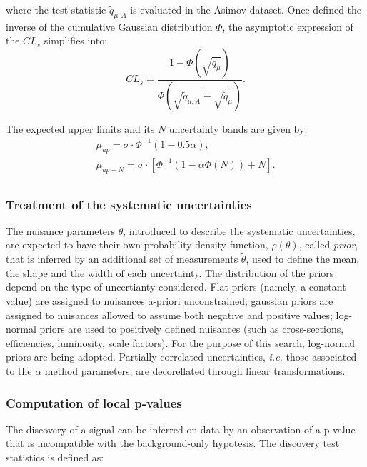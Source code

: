 \noindent where the test statistic $\tilde{q}_{\mu, A}$ is evaluated in the Asimov dataset. Once defined the inverse of the cumulative Gaussian distribution $\Phi$, the asymptotic expression of the $CL_s$ simplifies into:
\begin{equation}
CL_s = \frac{1 - \Phi \left( \sqrt{\tilde{q}_{\mu}} \right)}{ \Phi \left( \sqrt{\tilde{q}_{\mu, A}} - \sqrt{\tilde{q}_{\mu}} \right) }.
\end{equation}

\noindent The expected upper limits and its $N$ uncertainty bands are given by:
\begin{equation}
\begin{gathered}
\mu_{up} = \sigma \cdot \Phi^{-1} \left( 1 - 0.5 \alpha \right),\\
\mu_{up + N} = \sigma \cdot \left[ \Phi^{-1}  \left( 1 - \alpha \Phi(N)  \right) + N \right].\\
\end{gathered}
\end{equation}

\subsubsection{Treatment of the systematic uncertainties}
The nuisance parameters $\theta$, introduced to describe the systematic uncertainties, are expected to have their own probability density function, $\rho (\theta)$, called \emph{prior}, that is inferred by an additional set of measurements $\tilde{\theta}$, used to define the mean, the shape and the width of each uncertainty. The distribution of the priors depend on the type of uncertianty considered. Flat priors (namely, a constant value) are assigned to nuisances a-priori unconstrained; gaussian priors are assigned to nuisances allowed to assume both negative and positive values; log-normal priors are used to positively defined nuisances (such as cross-sections, efficiencies, luminosity, scale factors). For the purpose of this search, log-normal priors are being adopted. Partially correlated uncertainties, \textit{i.e.} those associated to the $\alpha$ method parameters, are decorellated through linear transformations.

\subsubsection{Computation of local p-values}
The discovery of a signal can be inferred on data by an observation of a p-value that is incompatible with the background-only hypotesis. The discovery test statistics is defined as:

